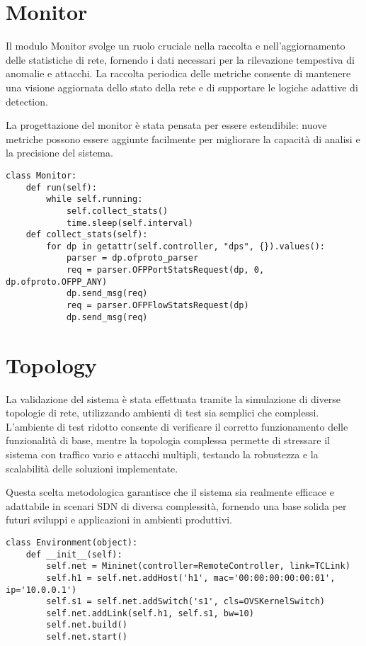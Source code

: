 \section{Monitor}
Il modulo Monitor svolge un ruolo cruciale nella raccolta e nell’aggiornamento delle statistiche di rete, fornendo i dati necessari per la rilevazione tempestiva di anomalie e attacchi. La raccolta periodica delle metriche consente di mantenere una visione aggiornata dello stato della rete e di supportare le logiche adattive di detection.\par
La progettazione del monitor è stata pensata per essere estendibile: nuove metriche possono essere aggiunte facilmente per migliorare la capacità di analisi e la precisione del sistema.
\begin{verbatim}
class Monitor:
    def run(self):
        while self.running:
            self.collect_stats()
            time.sleep(self.interval)
    def collect_stats(self):
        for dp in getattr(self.controller, "dps", {}).values():
            parser = dp.ofproto_parser
            req = parser.OFPPortStatsRequest(dp, 0, dp.ofproto.OFPP_ANY)
            dp.send_msg(req)
            req = parser.OFPFlowStatsRequest(dp)
            dp.send_msg(req)
\end{verbatim}

\section{Topology}
La validazione del sistema è stata effettuata tramite la simulazione di diverse topologie di rete, utilizzando ambienti di test sia semplici che complessi. L’ambiente di test ridotto consente di verificare il corretto funzionamento delle funzionalità di base, mentre la topologia complessa permette di stressare il sistema con traffico vario e attacchi multipli, testando la robustezza e la scalabilità delle soluzioni implementate.\par
Questa scelta metodologica garantisce che il sistema sia realmente efficace e adattabile in scenari SDN di diversa complessità, fornendo una base solida per futuri sviluppi e applicazioni in ambienti produttivi.
\begin{verbatim}
class Environment(object):
    def __init__(self):
        self.net = Mininet(controller=RemoteController, link=TCLink)
        self.h1 = self.net.addHost('h1', mac='00:00:00:00:00:01', ip='10.0.0.1')
        self.s1 = self.net.addSwitch('s1', cls=OVSKernelSwitch)
        self.net.addLink(self.h1, self.s1, bw=10)
        self.net.build()
        self.net.start()
\end{verbatim}

